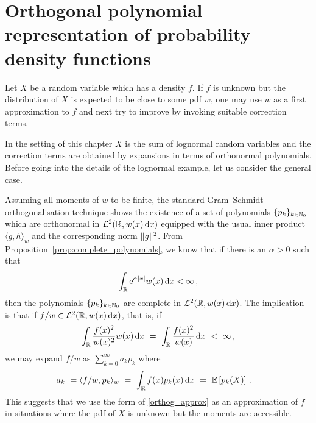 \section{Orthogonal polynomial representation of probability density functions}
\label{S:OrthPol}

Let $X$ be a random variable which has a density $f$. If $f$ is unknown but the distribution of $X$ is
expected to be close to some pdf $w$, one may use $w$ as a first approximation to $f$ and next try
to improve by invoking suitable correction terms.

In the setting of this chapter $X$ is the sum of lognormal random variables and the correction terms are obtained by expansions in terms of orthonormal polynomials.
Before going into the details of the lognormal example, let us consider the general case.

\newpage
Assuming all moments of $w$ to be finite,
the standard Gram--Schmidt orthogonalisation technique shows the existence
of a set of polynomials $\{p_k\}_{k\in\mathbb{N}_0}$ which are orthonormal in
$\mathcal{L}^2(\mathbb{R}, w(x) \mathop{}\!\mathrm{d} x)$ equipped with the usual inner product
$\langle g, h \rangle_w$ and the corresponding norm
$\lVert g\rVert^2$.
From Proposition~\ref{prop:complete_polynomials}, we know that if there is an $\alpha>0$ such that
\begin{equation}\label{DefinedMGFCondition}
\int_{\mathbb{R}} \mathrm{e}^{\alpha|x|} w(x) \mathop{}\!\mathrm{d} x < \infty\,,
\end{equation}
then the polynomials $\{p_k\}_{k\in\mathbb{N}_0}$ are complete in $\mathcal{L}^2(\mathbb{R}, w(x) \mathop{}\!\mathrm{d} x)$. The implication is that if $f/w \in \mathcal{L}^2(\mathbb{R}, w(x) \mathop{}\!\mathrm{d} x)$, that is, if
\begin{equation}\label{L2Condition1}
\int_{\mathbb{R}} \frac{f(x)^2}{w(x)^2} w(x) \mathop{}\!\mathrm{d} x\ =\ \int_{\mathbb{R}} \frac{f(x)^2}{w(x)} \mathop{}\!\mathrm{d} x\ <\ \infty\,,
\end{equation}
we may expand $f/w$ as $\sum_{k=0}^\infty a_k p_k$ where
\begin{align}\label{28.10a}a_k\ &=
\langle f/w, p_k \rangle_w\ =\ \int_{\RL} f(x) p_k(x) \dd x\ =\ \Exp\left[p_k(X)\right]\,.
\end{align}
This suggests that we use the form of \eqref{orthog_approx} as an approximation of $f$ in situations where the pdf of $X$ is unknown but the moments are accessible.


